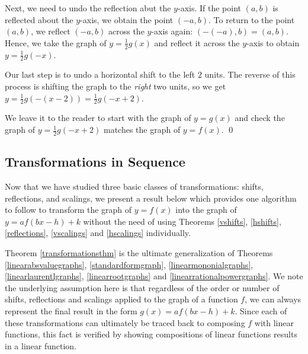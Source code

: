 \begin{ex}
\begin{enumerate}
 Next, we need to undo the reflection abut the $y$-axis.  If the point $(a,b)$ is reflected about the $y$-axis, we obtain the point $(-a,b)$.  To return to the point $(a,b)$, we reflect $(-a,b)$ across the $y$-axis again: $(-(-a),b) = (a,b)$.  Hence, we take the graph of $y = \frac{1}{2} g(x)$ and reflect it across the $y$-axis to obtain $y = \frac{1}{2} g(-x)$.  
 
 Our last step is to undo a horizontal shift to the left $2$ units.  The reverse of this process is shifting the graph to the \textit{right} two units, so we get $y = \frac{1}{2} g(-(x-2)) = \frac{1}{2} g(-x+2)$.  
 
 We leave it to the reader to start with the graph of $y=g(x)$ and check the graph of $y =  \frac{1}{2} g(-x+2)$ matches the graph of $y = f(x)$. \qed

\end{enumerate}

\end{ex}

\subsection{Transformations in Sequence}
\label{TransformationsinSequence}

Now that we have studied  three basic classes of transformations:  shifts, reflections, and scalings, we present a result below which provides one algorithm to follow to transform the graph of $y=f(x)$ into the graph of $y=af(bx-h)+k$ without the need of using Theorems \ref{vshifts}, \ref{hshifts}, \ref{reflections}, \ref{vscalings} and \ref{hscalings} individually.  

Theorem \ref{transformationsthm} is the ultimate generalization of Theorems \ref{linearabsvaluegraphs}, \ref{standardformgraph}, \ref{linearmononialgraphs},  \ref{linearlaurentlgraphs}, \ref{linearrootgraphs} and \ref{linearrationalpowergraphs}.  We note the underlying assumption here is that regardless of the order or number of shifts, reflections and scalings applied to the graph of a function $f$, we can always represent the final result in the form $g(x) = a f(bx-h)+k$.   Since each of these transformations can ultimately be traced back to composing $f$ with linear functions, this fact is verified by showing compositions of linear functions results in a linear function.

